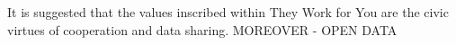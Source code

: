 \color{blue}
  It is suggested that the values inscribed within They Work for You are the civic virtues of cooperation and data sharing.
  MOREOVER - OPEN DATA
\color{darkgray}